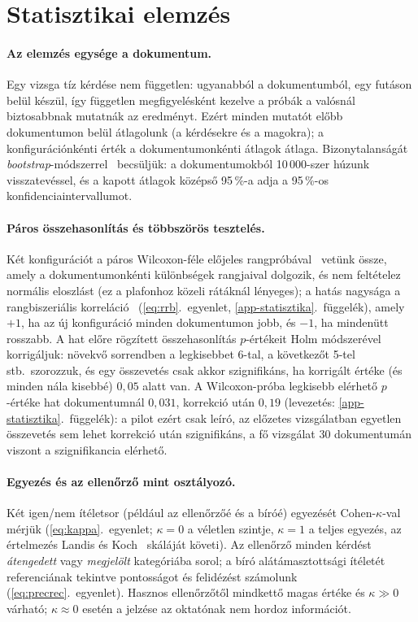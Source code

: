 \section{Statisztikai elemzés}
\label{sec:statisztika}

\paragraph{Az elemzés egysége a dokumentum.} Egy vizsga tíz kérdése nem független: ugyanabból a
dokumentumból, egy futáson belül készül, így független megfigyelésként kezelve a próbák a valósnál
biztosabbnak mutatnák az eredményt. Ezért minden mutatót előbb dokumentumon belül átlagolunk (a kérdésekre
és a magokra); a konfigurációnkénti érték a dokumentumonkénti átlagok átlaga. Bizonytalanságát
\emph{bootstrap}-módszerrel~\cite{efron1993} becsüljük: a dokumentumokból 10\,000-szer húzunk
visszatevéssel, és a kapott átlagok középső 95\,\%-a adja a 95\,\%-os konfidenciaintervallumot.

\paragraph{Páros összehasonlítás és többszörös tesztelés.} Két konfigurációt a páros Wilcoxon-féle
előjeles rangpróbával~\cite{wilcoxon1945} vetünk össze, amely a dokumentumonkénti különbségek rangjaival
dolgozik, és nem feltételez normális eloszlást (ez a plafonhoz közeli rátáknál lényeges); a hatás nagysága
a rangbiszeriális korreláció~\cite{kerby2014} (\ref{eq:rrb}.~egyenlet, \ref{app-statisztika}.~függelék),
amely $+1$, ha az új konfiguráció minden dokumentumon jobb, és $-1$, ha mindenütt rosszabb. A hat előre
rögzített összehasonlítás $p$-értékeit Holm módszerével~\cite{holm1979} korrigáljuk: növekvő sorrendben a
legkisebbet 6-tal, a következőt 5-tel stb.\ szorozzuk, és egy összevetés csak akkor szignifikáns, ha
korrigált értéke (és minden nála kisebbé) $0{,}05$ alatt van. A Wilcoxon-próba legkisebb elérhető
$p$-értéke hat dokumentumnál $0{,}031$, korrekció után $0{,}19$ (levezetés: \ref{app-statisztika}.~függelék):
a pilot ezért csak leíró, az előzetes vizsgálatban egyetlen összevetés sem lehet korrekció után
szignifikáns, a fő vizsgálat 30 dokumentumán viszont a szignifikancia elérhető.

\paragraph{Egyezés és az ellenőrző mint osztályozó.} Két igen/nem ítéletsor (például az ellenőrzőé és a
bíróé) egyezését Cohen-$\kappa$-val~\cite{cohen1960kappa} mérjük (\ref{eq:kappa}.~egyenlet; $\kappa=0$ a
véletlen szintje, $\kappa=1$ a teljes egyezés, az értelmezés Landis és Koch~\cite{landis1977} skáláját
követi). Az ellenőrző minden kérdést \emph{átengedett} vagy \emph{megjelölt} kategóriába sorol; a bíró
alátámasztottsági ítéletét referenciának tekintve pontosságot és felidézést számolunk
(\ref{eq:precrec}.~egyenlet). Hasznos ellenőrzőtől mindkettő magas értéke és $\kappa\gg0$ várható;
$\kappa\approx0$ esetén a jelzése az oktatónak nem hordoz információt.

